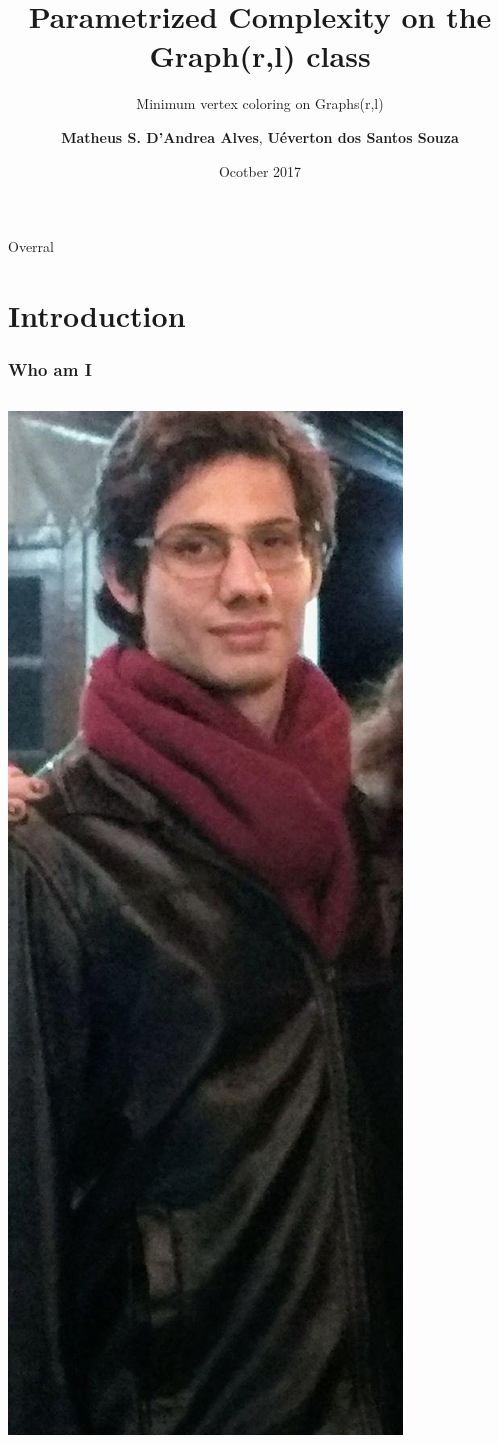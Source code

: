 \documentclass[9pt, compress]{beamer}
\author{\textbf{Matheus S. D'Andrea Alves}, \textbf{Uéverton dos Santos Souza} }
\title{Parametrized Complexity on the Graph(r,l) class}
\subtitle{Minimum vertex coloring on Graphs(r,l)}
\institute{\textbf{Universidade Federal Fluminense}}
\date{Ocotber 2017}
\begin{document}
    \maketitle
    \begin{frame}{Overral}
    \centering
        \tableofcontents
    \end{frame}
    \section{Introduction}
    \begin{frame}
        \frametitle{Who am I}
        \begin{columns}
          \begin{column}{0.3\textwidth}
            \includegraphics[scale=0.2]{../figuras/foto.jpg}

\end{column}
\end{columns}
\end{frame}
\end{document}
